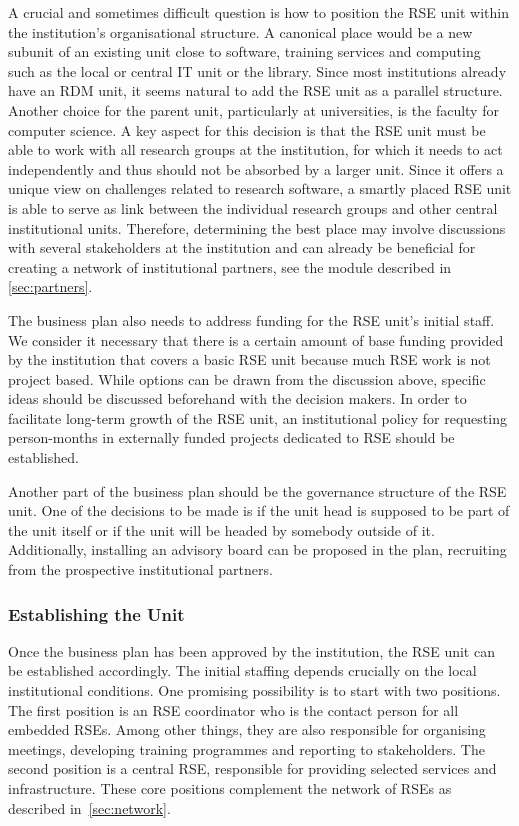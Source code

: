 \documentclass[a4paper]{article}
\begin{document}
A crucial and sometimes difficult question is how to position the RSE unit within the institution’s organisational structure.
A canonical place would be a new subunit of an existing unit close to software, training services and computing such as the local or central IT unit or the library.
Since most institutions already have an RDM unit, it seems natural to add the RSE unit as a parallel structure.
Another choice for the parent unit, particularly at universities, is the faculty for computer science.
A key aspect for this decision is that the RSE unit must be able to work with all research groups at the institution, for which it needs to act independently and thus should not be absorbed by a larger unit.
Since it offers a unique view on challenges related to research software, a smartly placed RSE unit is able to serve as link between the individual research groups and other central institutional units.
Therefore, determining the best place may involve discussions with several stakeholders at the institution and can already be beneficial for creating a network of institutional partners, see the module described in \autoref{sec:partners}.

The business plan also needs to address funding for the RSE unit's initial staff.
We consider it necessary that there is a certain amount of base funding provided by the institution that covers a basic RSE unit because much RSE work is not project based.
While options can be drawn from the discussion above, specific ideas should be discussed beforehand with the decision makers.
In order to facilitate long-term growth of the RSE unit, an institutional policy for requesting person-months in externally funded projects dedicated to RSE should be established.

Another part of the business plan should be the governance structure of the RSE unit.
One of the decisions to be made is if the unit head is supposed to be part of the unit itself or if the unit will be headed by somebody outside of it.
Additionally, installing an advisory board can be proposed in the plan, recruiting from the prospective institutional partners.

\subsubsection{Establishing the Unit}
Once the business plan has been approved by the institution, the RSE unit can be established accordingly.
The initial staffing depends crucially on the local institutional conditions.
One promising possibility is to start with two positions.
The first position is an RSE coordinator who is the contact person for all embedded RSEs.
Among other things, they are also responsible for organising meetings, developing training programmes and reporting to stakeholders.
The second position is a central RSE, responsible for providing selected services and infrastructure.
These core positions complement the network of RSEs as described in~\autoref{sec:network}.
\end{document}

